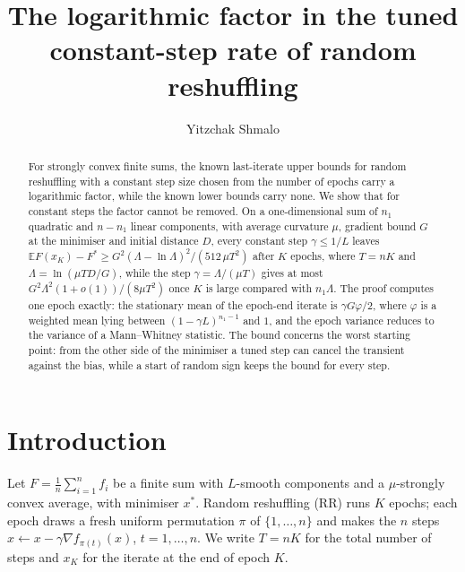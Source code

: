 \documentclass[11pt]{amsart}
\title[The logarithmic factor in constant-step random reshuffling]{The logarithmic factor in the tuned constant-step rate of random reshuffling}
\author{Yitzchak Shmalo}
\theoremstyle{remark}\newtheorem{remark}[theorem]{Remark}
\newcommand{\E}{\mathbb{E}}
\begin{document}
\begin{abstract}
For strongly convex finite sums, the known last-iterate upper bounds for random reshuffling with a constant step size
chosen from the number of epochs carry a logarithmic factor, while the known lower bounds carry none. We show that for
constant steps the factor cannot be removed. On a one-dimensional sum of $n_1$ quadratic and $n-n_1$ linear components,
with average curvature $\mu$, gradient bound $G$ at the minimiser and initial distance $D$, every constant step
$\gamma\le 1/L$ leaves $\E F(x_K)-F^*\ge G^2(\Lambda-\ln\Lambda)^2/(512\,\mu T^2)$ after $K$ epochs, where $T=nK$ and
$\Lambda=\ln(\mu TD/G)$, while the step $\gamma=\Lambda/(\mu T)$ gives at most $G^2\Lambda^2(1+o(1))/(8\mu T^2)$ once $K$ is large compared with $n_1\Lambda$. The proof
computes one epoch exactly: the stationary mean of the epoch-end iterate is $\gamma G\varphi/2$, where $\varphi$ is a
weighted mean lying between $(1-\gamma L)^{n_1-1}$ and $1$, and the epoch variance reduces to the variance of a
Mann--Whitney statistic. The bound concerns the worst starting point: from the other side of the minimiser a tuned step
can cancel the transient against the bias, while a start of random sign keeps the bound for every step.
\end{abstract}
\maketitle

\section{Introduction}

Let $F=\frac1n\sum_{i=1}^n f_i$ be a finite sum with $L$-smooth components and a $\mu$-strongly convex average, with
minimiser $x^*$. Random reshuffling (RR) runs $K$ epochs; each epoch draws a fresh uniform permutation $\pi$ of
$\{1,\dots,n\}$ and makes the $n$ steps $x\leftarrow x-\gamma\nabla f_{\pi(t)}(x)$, $t=1,\dots,n$. We write $T=nK$ for
the total number of steps and $x_K$ for the iterate at the end of epoch $K$.
\end{document}
